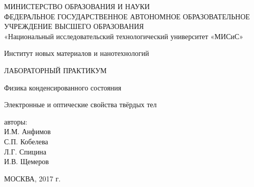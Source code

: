 \begin{titlepage}

\begin{center}
\MakeUppercase{Министерство образования и науки} \\
\MakeUppercase{Федеральное государственное автономное образовательное учреждение высшего образования} \\
«Национальный исследовательский технологический университет «МИСиС»

Институт новых материалов и нанотехнологий

\vspace{2cm}

ЛАБОРАТОРНЫЙ ПРАКТИКУМ

Физика конденсированного состояния

Электронные и оптические свойства твёрдых тел

\vspace{3cm}

авторы: \\
И.М. Анфимов \\
С.П. Кобелева \\
Л.Г. Спицина \\
И.В. Щемеров

\vspace{3cm}

МОСКВА, 2017 г.
\end{center}

\end{titlepage}